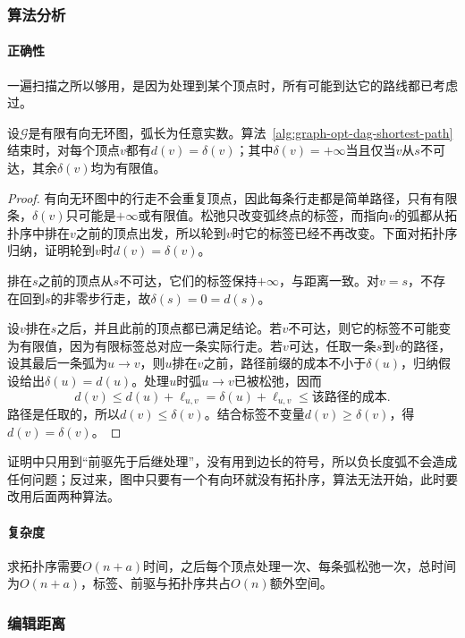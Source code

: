 \subsubsection{算法分析}

\paragraph{正确性}
一遍扫描之所以够用，是因为处理到某个顶点时，所有可能到达它的路线都已考虑过。

\begin{theorem}[有向无环图上最短路的正确性]
\label{thm:graph-opt-dag-shortest-path}
设$\mathcal G$是有限有向无环图，弧长为任意实数。算法~\ref{alg:graph-opt-dag-shortest-path}结束时，对每个顶点$v$都有$d(v)=\delta(v)$；其中$\delta(v)=+\infty$当且仅当$v$从$s$不可达，其余$\delta(v)$均为有限值。
\end{theorem}

\begin{proof}
有向无环图中的行走不会重复顶点，因此每条行走都是简单路径，只有有限条，$\delta(v)$只可能是$+\infty$或有限值。松弛只改变弧终点的标签，而指向$v$的弧都从拓扑序中排在$v$之前的顶点出发，所以轮到$v$时它的标签已经不再改变。下面对拓扑序归纳，证明轮到$v$时$d(v)=\delta(v)$。

排在$s$之前的顶点从$s$不可达，它们的标签保持$+\infty$，与距离一致。对$v=s$，不存在回到$s$的非零步行走，故$\delta(s)=0=d(s)$。

设$v$排在$s$之后，并且此前的顶点都已满足结论。若$v$不可达，则它的标签不可能变为有限值，因为有限标签总对应一条实际行走。若$v$可达，任取一条$s$到$v$的路径，设其最后一条弧为$u\to v$，则$u$排在$v$之前，路径前缀的成本不小于$\delta(u)$，归纳假设给出$\delta(u)=d(u)$。处理$u$时弧$u\to v$已被松弛，因而
\[
  d(v)\leq d(u)+\ell_{u,v}=\delta(u)+\ell_{u,v}\leq\text{该路径的成本}.
\]
路径是任取的，所以$d(v)\leq\delta(v)$。结合标签不变量$d(v)\geq\delta(v)$，得$d(v)=\delta(v)$。
\end{proof}

证明中只用到“前驱先于后继处理”，没有用到边长的符号，所以负长度弧不会造成任何问题；反过来，图中只要有一个有向环就没有拓扑序，算法无法开始，此时要改用后面两种算法。

\paragraph{复杂度}
求拓扑序需要$O(n+a)$时间，之后每个顶点处理一次、每条弧松弛一次，总时间为$O(n+a)$，标签、前驱与拓扑序共占$O(n)$额外空间。

\subsubsection{编辑距离}


